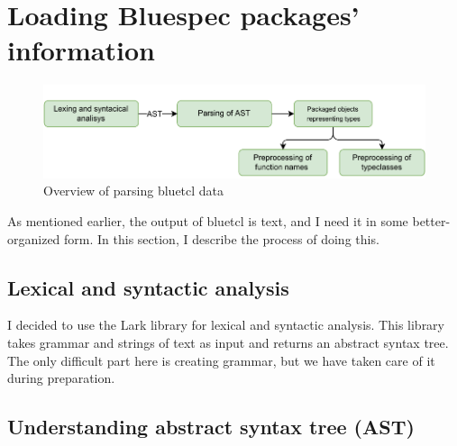 \documentclass[12pt]{report}
\begin{document}
\section{Loading Bluespec packages' information}  

\begin{figure}[!h]  
   \centering  
   \caption{Overview of parsing bluetcl data}  
   \includegraphics[width=1.0\columnwidth]{pdfExports/LargeMapProcessing.pdf}  
\end{figure}  

As mentioned earlier, the output of bluetcl is text, and I need it in some better-organized form. In this section, I describe the process of doing this.  
\subsection{Lexical and syntactic analysis}  
I decided to use the Lark library for lexical and syntactic analysis. This library takes grammar and strings of text as input and returns an abstract syntax tree. The only difficult part here is creating grammar, but we have taken care of it during preparation. 
\subsection{Understanding abstract syntax tree (AST)}  
\end{document}
